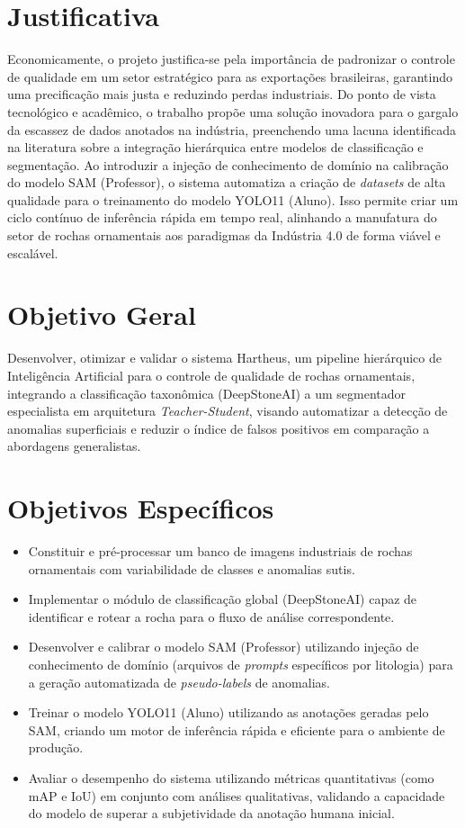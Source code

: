 \section{Justificativa}
Economicamente, o projeto justifica-se pela importância de padronizar o controle de qualidade em um setor estratégico para as exportações brasileiras, garantindo uma precificação mais justa e reduzindo perdas industriais. Do ponto de vista tecnológico e acadêmico, o trabalho propõe uma solução inovadora para o gargalo da escassez de dados anotados na indústria, preenchendo uma lacuna identificada na literatura sobre a integração hierárquica entre modelos de classificação e segmentação. Ao introduzir a injeção de conhecimento de domínio na calibração do modelo SAM (Professor), o sistema automatiza a criação de \textit{datasets} de alta qualidade para o treinamento do modelo YOLO11 (Aluno). Isso permite criar um ciclo contínuo de inferência rápida em tempo real, alinhando a manufatura do setor de rochas ornamentais aos paradigmas da Indústria 4.0 de forma viável e escalável.

\section{Objetivo Geral}
Desenvolver, otimizar e validar o sistema Hartheus, um pipeline hierárquico de Inteligência Artificial para o controle de qualidade de rochas ornamentais, integrando a classificação taxonômica (DeepStoneAI) a um segmentador especialista em arquitetura \textit{Teacher-Student}, visando automatizar a detecção de anomalias superficiais e reduzir o índice de falsos positivos em comparação a abordagens generalistas.

\section{Objetivos Específicos}
\begin{itemize}
    \item Constituir e pré-processar um banco de imagens industriais de rochas ornamentais com variabilidade de classes e anomalias sutis.
    \item Implementar o módulo de classificação global (DeepStoneAI) capaz de identificar e rotear a rocha para o fluxo de análise correspondente.
    \item Desenvolver e calibrar o modelo SAM (Professor) utilizando injeção de conhecimento de domínio (arquivos de \textit{prompts} específicos por litologia) para a geração automatizada de \textit{pseudo-labels} de anomalias.
    \item Treinar o modelo YOLO11 (Aluno) utilizando as anotações geradas pelo SAM, criando um motor de inferência rápida e eficiente para o ambiente de produção.
    \item Avaliar o desempenho do sistema utilizando métricas quantitativas (como mAP e IoU) em conjunto com análises qualitativas, validando a capacidade do modelo de superar a subjetividade da anotação humana inicial.
\end{itemize}

